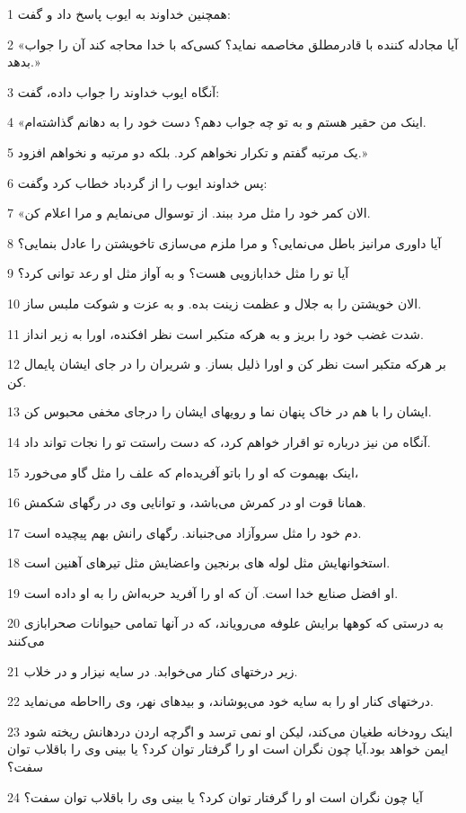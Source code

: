 \par 1 همچنین خداوند به ایوب پاسخ داد و گفت:
\par 2 «آیا مجادله کننده با قادرمطلق مخاصمه نماید؟ کسی‌که با خدا محاجه کند آن را جواب بدهد.»
\par 3 آنگاه ایوب خداوند را جواب داده، گفت:
\par 4 «اینک من حقیر هستم و به تو چه جواب دهم؟ دست خود را به دهانم گذاشته‌ام.
\par 5 یک مرتبه گفتم و تکرار نخواهم کرد. بلکه دو مرتبه و نخواهم افزود.»
\par 6 پس خداوند ایوب را از گردباد خطاب کرد وگفت:
\par 7 «الان کمر خود را مثل مرد ببند. از توسوال می‌نمایم و مرا اعلام کن.
\par 8 آیا داوری مرانیز باطل می‌نمایی؟ و مرا ملزم می‌سازی تاخویشتن را عادل بنمایی؟
\par 9 آیا تو را مثل خدابازویی هست؟ و به آواز مثل او رعد توانی کرد؟
\par 10 الان خویشتن را به جلال و عظمت زینت بده. و به عزت و شوکت ملبس ساز.
\par 11 شدت غضب خود را بریز و به هرکه متکبر است نظر افکنده، اورا به زیر انداز.
\par 12 بر هرکه متکبر است نظر کن و اورا ذلیل بساز. و شریران را در جای ایشان پایمال کن.
\par 13 ایشان را با هم در خاک پنهان نما و رویهای ایشان را درجای مخفی محبوس کن.
\par 14 آنگاه من نیز درباره تو اقرار خواهم کرد، که دست راستت تو را نجات تواند داد.
\par 15 اینک بهیموت که او را باتو آفریده‌ام که علف را مثل گاو می‌خورد،
\par 16 همانا قوت او در کمرش می‌باشد، و توانایی وی در رگهای شکمش.
\par 17 دم خود را مثل سروآزاد می‌جنباند. رگهای رانش بهم پیچیده است.
\par 18 استخوانهایش مثل لوله های برنجین واعضایش مثل تیرهای آهنین است.
\par 19 او افضل صنایع خدا است. آن که او را آفرید حربه‌اش را به او داده است.
\par 20 به درستی که کوهها برایش علوفه می‌رویاند، که در آنها تمامی حیوانات صحرابازی می‌کنند
\par 21 زیر درختهای کنار می‌خوابد. در سایه نیزار و در خلاب.
\par 22 درختهای کنار او را به سایه خود می‌پوشاند، و بیدهای نهر، وی رااحاطه می‌نماید.
\par 23 اینک رودخانه طغیان می‌کند، لیکن او نمی ترسد و اگر‌چه اردن دردهانش ریخته شود ایمن خواهد بود.آیا چون نگران است او را گرفتار توان کرد؟ یا بینی وی را باقلاب توان سفت؟
\par 24 آیا چون نگران است او را گرفتار توان کرد؟ یا بینی وی را باقلاب توان سفت؟
 
